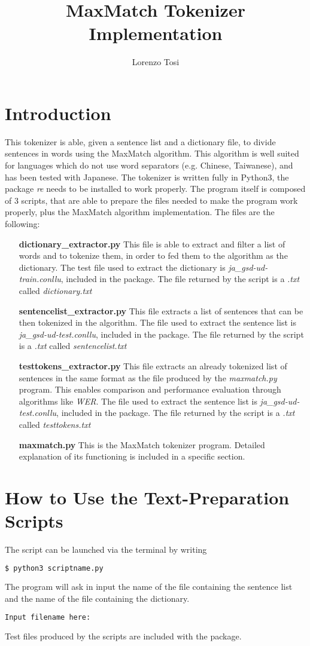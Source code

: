 \documentclass{hitec}
\author{Lorenzo Tosi}
\title{MaxMatch Tokenizer Implementation}
\begin{document}
	\maketitle
	\tableofcontents
	\section{Introduction}
	This tokenizer is able, given a sentence list and a dictionary file, to divide sentences in words using the MaxMatch algorithm. This algorithm is well suited for languages which do not use word separators (e.g. Chinese, Taiwanese), and has been tested with Japanese. The tokenizer is written fully in Python3, the package \textit{re} needs to be installed to work properly. The program itself is composed of 3 scripts, that are able to prepare the files needed to make the program work properly, plus the MaxMatch algorithm implementation. The files are the following:
	\begin{itemize}
		\item [\textbf{dictionary\_extractor.py}] This file is able to extract and filter a list of words and to tokenize them, in order to fed them to the algorithm as the dictionary. The test file used to extract the dictionary is \textit{ja\_gsd-ud-train.conllu}, included in the package. The file returned by the script is a \textit{.txt} called \textit{dictionary.txt}
		\item [\textbf{sentencelist\_extractor.py}] This file extracts a list of sentences that can be then tokenized in the algorithm. The file used to extract the sentence list is \textit{ja\_gsd-ud-test.conllu}, included in the package. The file returned by the script is a \textit{.txt} called \textit{sentencelist.txt}
		\item [\textbf{testtokens\_extractor.py}] This file extracts an already tokenized list of sentences in the same format as the file produced by the \textit{maxmatch.py} program. This enables comparison and performance evaluation through algorithms like \textit{WER}. The file used to extract the sentence list is \textit{ja\_gsd-ud-test.conllu}, included in the package. The file returned by the script is a \textit{.txt} called \textit{testtokens.txt}
		\item [\textbf{maxmatch.py}] This is the MaxMatch tokenizer program. Detailed explanation of its functioning is included in a specific section.
	\end{itemize}
	\section{How to Use the Text-Preparation Scripts}
	The script can be launched via the terminal by writing \begin{lstlisting}[language=bash]
	$ python3 scriptname.py
	\end{lstlisting}
	The program will ask in input the name of the file containing the sentence list and the name of the file containing the dictionary.
	\begin{lstlisting}[language=bash]
	Input filename here:
	\end{lstlisting}
	Test files produced by the scripts are included with the package.
\end{document}
